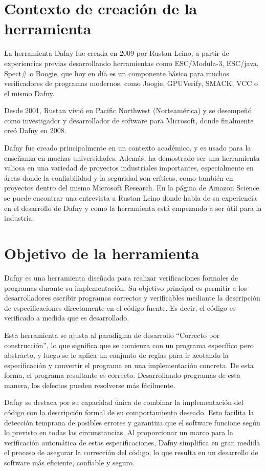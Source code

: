 \documentclass[runningheads]{llncs}
\begin{document}
\section{Contexto de creación de la herramienta}

La herramienta Dafny fue creada en 2009 por Rustan Leino,
a partir de experiencias previas desarrollando herramientas como ESC/Modula-3, ESC/java, Spect\# o Boogie,
que hoy en día es un componente básico para muchos verificadores de programas modernos,
como Joogie, GPUVerify, SMACK, VCC o el mismo Dafny.

Desde 2001, Rustan vivió en Pacific Northwest (Norteamérica) y se desempeñó como investigador y desarrollador de software para Microsoft,
donde finalmente creó Dafny en 2008.

Dafny fue creado principalmente en un contexto académico, 
y es usado para la enseñanza en muchas universidades.
Además, ha demostrado ser una herramienta valiosa en una variedad de proyectos industriales importantes, 
especialmente en áreas donde la confiabilidad y la seguridad son críticas, 
como también en proyectos dentro del mismo Microsoft Research.
En la página de Amazon Science \cite{EntrevistaLeino} se puede encontrar una entrevista a Rustan Leino donde habla de su experiencia en el desarrollo de Dafny y 
como la herramienta está empezando a ser útil para la industria.

\section{Objetivo de la herramienta}

Dafny es una herramienta diseñada para realizar verificaciones formales de programas durante su implementación.
Su objetivo principal es permitir a los desarrolladores escribir programas correctos y verificables mediante la descripción
de especificaciones directamente en el código fuente. Es decir, el código es verificado a medida que es desarrollado.

Esta herramienta se ajusta al paradigma de desarrollo ``Correcto por construcción'', lo que significa que se comienza
con un programa específico pero abstracto, y luego se le aplica un conjunto de reglas para ir acotando la especificación
y convertir el programa en una implementación concreta. De esta forma, el programa resultante es correcto.
Desarrollando programas de esta manera, los defectos pueden resolverse más fácilmente.

Dafny se destaca por su capacidad única de combinar la implementación del código con la descripción formal de su comportamiento
deseado. Esto facilita la detección temprana de posibles errores y garantiza que el software funcione según lo previsto en todas
las circunstancias. Al proporcionar un marco para la verificación automática de estas especificaciones, Dafny simplifica en gran
medida el proceso de asegurar la corrección del código, lo que resulta en un desarrollo de software más eficiente, confiable y seguro.
\end{document}
